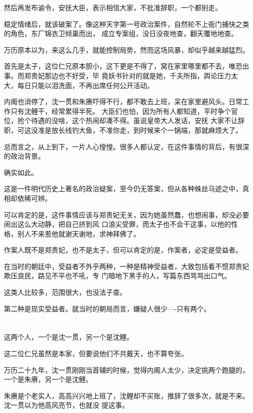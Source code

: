 \documentclass[11pt,a4paper,onecolumn]{article}
\begin{document}
然后再发布谕令，安抚大臣，表示相信大家，不批准辞职，一个都别走。

稳定情绪后，就该破案了。像这种天字第一号政治案件，自然轮不上衙门捕快之类的角色，东厂锦衣卫倾巢而出，
成立专案组，没日没夜地查，翻天覆地地查。

万历原本以为，来这么几手，就能控制局势，然而这场风暴，却似乎越来越猛烈。

首先是太子，这位仁兄原本胆小，这下更是不得了，窝在家里哪里都不去，唯恐出事。而郑贵妃那边也不好受，毕
竟妖书针对的就是她，千夫所指，舆论压力太大，每日只能以泪洗面，不再出席任何公开活动。

内阁也消停了，沈一贯和朱赓吓得不行，都不敢去上班，呆在家里避风头。日常工作只有沈鲤干，经常累得半死。
大臣们也怕，因为所有人都知道，平时争个官位，抢个待遇的没啥，这个热闹却凑不得。虽说皇帝大人发话，安抚
大家不让辞职，可这没准是放长线钓大鱼，不准你走，到时候来个一锅端，那就麻烦大了。

总而言之，从上到下，一片人心惶惶。很多人都认定，在这件事情的背后，有很深的政治背景。

确实如此。

这是一件明代历史上著名的政治疑案，至今仍无答案，但从各种蛛丝马迹之中，真相却依稀可辨。

可以肯定的是，这件事情应该与郑贵妃无关，因为她虽然蠢，也想闹事，却没必要闹出这么大动静，把自己挤到风
口浪尖受罪，而太子也不会干这事，以他的性格，别人不来惹他就谢天谢地，求神拜佛了。

作案人既不是郑贵妃，也不是太子，但可以肯定的是，作案者，必定是受益者。

在当时的朝廷中，受益者不外乎两种，一种是精神受益者，大致包括看不惯郑贵妃欺压良民，路见不平也不吼，专
门暗地下黑手的人，写篇东西骂骂出口气。

这类人比较多，范围很大，也没法子查。

第二种是现实受益者。就当时的朝局而言，嫌疑人很少----只有两个。

\section[\thesection]{}

这两个人，一个是沈一贯，另一个是沈鲤。

这二位仁兄虽然是本家，但要说他们不共戴天，也不算夸张。

万历二十九年，沈一贯刚刚当首辅的时候，觉得内阁人太少，决定挑两个跑腿的，一个是朱赓，另一个是沈鲤。

朱赓是个老实人，高高兴兴地上班了，沈鲤却不买账，推辞了很多次，就是不来。沈一贯以为他高风亮节，也就没
提这事。
\end{document}
